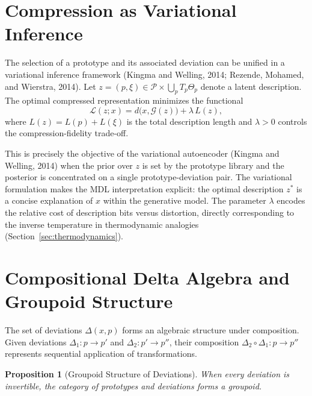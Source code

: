\documentclass[11pt,a4paper]{article}
\newtheorem{proposition}[theorem]{Proposition}
\theoremstyle{definition}
\theoremstyle{remark}
\begin{document}
\section{Compression as Variational Inference}
\label{sec:variational}

The selection of a prototype and its associated deviation can be unified in a variational inference framework (Kingma and Welling, 2014; Rezende, Mohamed, and Wierstra, 2014). Let $z = (p, \xi) \in \mathcal{P} \times \bigcup_{p} T_p\Theta_p$ denote a latent description. The optimal compressed representation minimizes the functional
\begin{equation}
\mathcal{L}(z; x) = d\big(x, \mathcal{G}(z)\big) + \lambda \, L(z),
\label{eq:variational}
\end{equation}
where $L(z) = L(p) + L(\xi)$ is the total description length and $\lambda > 0$ controls the compression-fidelity trade-off.

This is precisely the objective of the variational autoencoder (Kingma and Welling, 2014) when the prior over $z$ is set by the prototype library and the posterior is concentrated on a single prototype-deviation pair. The variational formulation makes the MDL interpretation explicit: the optimal description $z^*$ is a concise explanation of $x$ within the generative model. The parameter $\lambda$ encodes the relative cost of description bits versus distortion, directly corresponding to the inverse temperature in thermodynamic analogies (Section~\ref{sec:thermodynamics}).

\section{Compositional Delta Algebra and Groupoid Structure}
\label{sec:groupoid}

The set of deviations $\Delta(x,p)$ forms an algebraic structure under composition. Given deviations $\Delta_1 : p \rightarrow p'$ and $\Delta_2 : p' \rightarrow p''$, their composition $\Delta_2 \circ \Delta_1 : p \rightarrow p''$ represents sequential application of transformations.

\begin{proposition}[Groupoid Structure of Deviations]
When every deviation is invertible, the category of prototypes and deviations forms a \emph{groupoid}.
\end{proposition}
\end{document}
